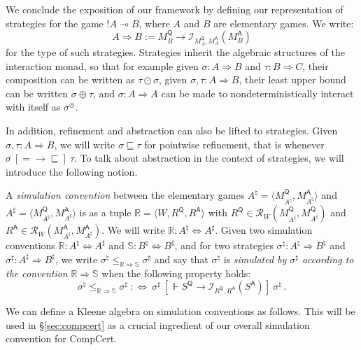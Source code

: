 \documentclass[acmsmall,timestamp,review,anonymous]{acmart}
\newcommand{\kw}[1]{\ensuremath{ \mathsf{#1} }}
\newcommand{\ifr}[1]{\ [{#1}]\ }
\begin{document}
We conclude the exposition of our framework
by defining our representation
of strategies for the game $!A \multimap B$,
where $A$ and $B$ are elementary games.
We write:
\[ A \Rightarrow B := M_B^\kw{Q} \rightarrow
   \mathcal{I}_{M_A^\kw{Q},M_A^\kw{A}}(M_B^\kw{A}) \]
for the type of such strategies.
Strategies inherit the algebraic structures
of the interaction monad,
so that for example
given $\sigma : A \Rightarrow B$ and $\tau : B \Rightarrow C$,
their composition can be written as $\tau \odot \sigma$,
given $\sigma, \tau : A \Rightarrow B$,
their least upper bound
can be written $\sigma \oplus \tau$,
and $\sigma : A \Rightarrow A$
can be made to nondeterministically interact with itself
as $\sigma^\circledcirc$.

In addition,
refinement and abstraction can also be lifted to strategies.
Given $\sigma, \tau : A \Rightarrow B$,
we will write $\sigma \sqsubseteq \tau$
for pointwise refinement,
that is whenever $\sigma \ifr{{=} \rightarrow {\sqsubseteq}} \tau$.
To talk about abstraction in the context of strategies,
we will introduce the following notion.

\begin{definition} %
A \emph{simulation convention} between the elementary games
$A^\natural = \langle M_{A^\natural}^\kw{Q}, M_{A^\natural}^\kw{A} \rangle$ and
$A^\sharp = \langle M_{A^\sharp}^\kw{Q}, M_{A^\sharp}^\kw{A} \rangle$
is as a tuple $\mathbb{R} = \langle W, R^\kw{Q}, R^\kw{A} \rangle$
with $R^\kw{Q} \in \mathcal{R}_W(M_{A^\natural}^\kw{Q}, M_{A^\sharp}^\kw{Q})$
and $R^\kw{A} \in \mathcal{R}_W(M_{A^\natural}^\kw{A}, M_{A^\sharp}^\kw{A})$.
We will write $\mathbb{R} : A^\natural \Leftrightarrow A^\sharp$.
Given two simulation conventions
$\mathbb{R} : A^\natural \Leftrightarrow A^\sharp$ and
$\mathbb{S} : B^\natural \Leftrightarrow B^\sharp$,
and for two strategies
$\sigma^\natural : A^\natural \Rightarrow B^\natural$ and
$\sigma^\sharp : A^\sharp \Rightarrow B^\sharp$,
we write $\sigma^\natural \le_{\mathbb{R} \Rightarrow \mathbb{S}} \sigma^\sharp$
and say that $\sigma^\natural$ is
\emph{simulated by $\sigma^\sharp$ according to the convention}
$\mathbb{R} \Rightarrow \mathbb{S}$
when the following property holds:
\[
  \sigma^\natural \le_{\mathbb{R} \Rightarrow \mathbb{S}} \sigma^\sharp
  \: :\Leftrightarrow \:
  \sigma^\sharp
  \ifr{\Vdash S^\kw{Q} \rightarrow
       \mathcal{I}_{R^\kw{Q}, R^\kw{A}}(S^\kw{A})}
  \sigma^\natural \,.
\]
\end{definition}

We can define a Kleene algebra on simulation conventions as follows.
This will be used in \S\ref{sec:compcert}
as a crucial ingredient of our overall simulation convention for CompCert.
\end{document}
